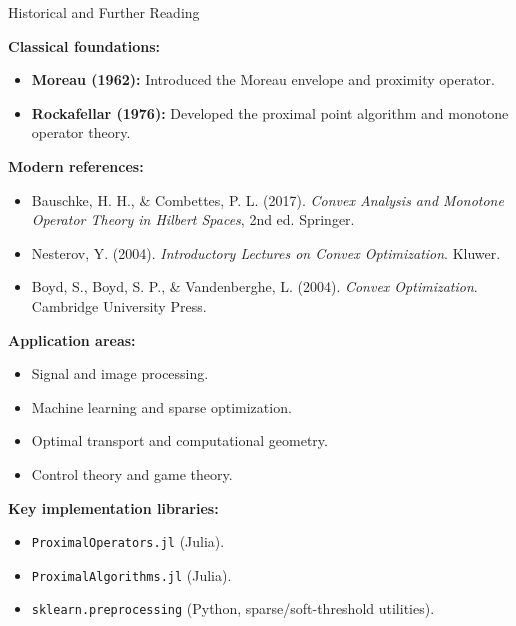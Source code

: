 \documentclass[aspectratio=169,10pt]{beamer}
\begin{document}
\begin{frame}[allowframebreaks]{Historical and Further Reading}

  \textbf{Classical foundations:}
  \begin{itemize}
    \item \textbf{Moreau (1962):} Introduced the Moreau envelope and proximity operator.
    \item \textbf{Rockafellar (1976):} Developed the proximal point algorithm and monotone operator theory.
  \end{itemize}

  \vspace{0.5cm}

  \textbf{Modern references:}
  \begin{itemize}
    \item Bauschke, H. H., \& Combettes, P. L. (2017).
      \textit{Convex Analysis and Monotone Operator Theory in Hilbert Spaces},
      2nd ed. Springer.
    \item Nesterov, Y. (2004).
      \textit{Introductory Lectures on Convex Optimization}. Kluwer.
    \item Boyd, S., Boyd, S. P., \& Vandenberghe, L. (2004).
      \textit{Convex Optimization}. Cambridge University Press.
  \end{itemize}

  \framebreak

  \textbf{Application areas:}
  \begin{itemize}
    \item Signal and image processing.
    \item Machine learning and sparse optimization.
    \item Optimal transport and computational geometry.
    \item Control theory and game theory.
  \end{itemize}

  \vspace{1cm}

  \textbf{Key implementation libraries:}
  \begin{itemize}
    \item \texttt{ProximalOperators.jl} (Julia).
    \item \texttt{ProximalAlgorithms.jl} (Julia).
    \item \texttt{sklearn.preprocessing} (Python, sparse/soft-threshold utilities).
  \end{itemize}

\end{frame}
\end{document}
